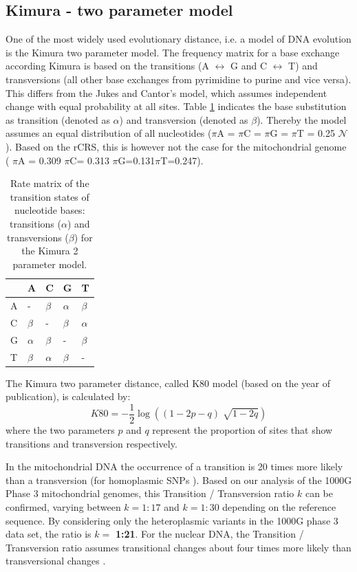 \subsection{Kimura - two parameter model}
One of the most widely used evolutionary distance, i.e. a model of DNA evolution is the Kimura two parameter model. The frequency matrix for a base exchange according Kimura \cite{Kimura1980} is based on the transitions (A $\leftrightarrow$ G and C $\leftrightarrow$ T) and transversions (all other base exchanges from pyrimidine to purine and vice versa). This differs from the Jukes and Cantor's model, which assumes independent change with equal probability at all sites.
Table \ref{hg:kimuratable} indicates the base substitution as transition (denoted as $\alpha$) and transversion (denoted as $\beta$). Thereby the model assumes an equal distribution of all nucleotides ($\pi$A = $\pi$C = $\pi$G = $\pi$T = 0.25 $\mathcal{N}$). Based on the rCRS, this is however not the case for the mitochondrial genome ( $\pi$A = 0.309 $\pi$C= 0.313 $\pi$G=0.131$\pi$T=0.247).
\begin{table}[h]

\centering
\caption{Rate matrix of the transition states of nucleotide bases: transitions ($\alpha$) and transversions ($\beta$) for the Kimura 2 parameter model.}
\label{hg:kimuratable}
\begin{tabular}{lllll}
\hline
   & A&  C   &G  & T\\
\hline

A  & - & $\beta$    & $\alpha$  & $\beta$ \\
C  & $\beta$ &  -   & $\beta$  & $\alpha$ \\
G  & $\alpha$ &  $\beta$    & - & $\beta$ \\
T  & $\beta$ &  $\alpha$    & $\beta$  & - \\
\end{tabular}
\end{table}

The Kimura two parameter distance, called K80 model (based on the year of publication), is calculated by:
\begin{equation}
K80 = - \frac{1}{2} \log((1- 2p -q ) \sqrt[]{1-2q})
\end{equation}
where the two parameters $p$ and $q$ represent the proportion of sites that show transitions and transversion respectively.

In the mitochondrial DNA the occurrence of a transition is 20 times more likely than a transversion (for homoplasmic SNPs \cite{Guo2012}). Based on our analysis of the 1000G Phase 3 mitochondrial genomes, this Transition / Transversion ratio $k$ can be confirmed, varying between $k=1:17$ and $k=1:30$ depending on the reference sequence. By considering only the heteroplasmic variants in the 1000G phase 3 data set, the ratio is $k=$ \textbf{1:21}. For the nuclear DNA, the Transition / Transversion ratio assumes transitional changes about four times more likely than transversional changes \cite{salemi2009the}. 


